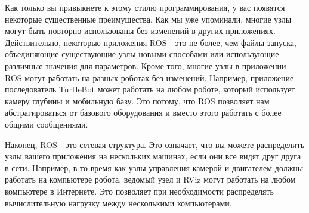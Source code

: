 Как только вы привыкнете к этому стилю программирования, у вас появятся некоторые существенные преимущества. Как мы уже упоминали, многие узлы могут быть повторно использованы без изменений в других приложениях. Действительно, некоторые приложения ROS - это не более, чем файлы запуска, объединяющие существующие узлы новыми способами или использующие различные значения для параметров. Кроме того, многие узлы в приложении ROS могут работать на разных роботах без изменений. Например, приложение-последователь TurtleBot может работать на любом роботе, который использует камеру глубины и мобильную базу. Это потому, что ROS позволяет нам абстрагироваться от базового оборудования и вместо этого работать с более общими сообщениями.

Наконец, ROS - это сетевая структура. Это означает, что вы можете распределить узлы вашего приложения на нескольких машинах, если они все видят друг друга в сети. Например, в то время как узлы управления камерой и двигателем должны работать на компьютере робота, ведомый узел и RViz могут работать на любом компьютере в Интернете. Это позволяет при необходимости распределять вычислительную нагрузку между несколькими компьютерами.

